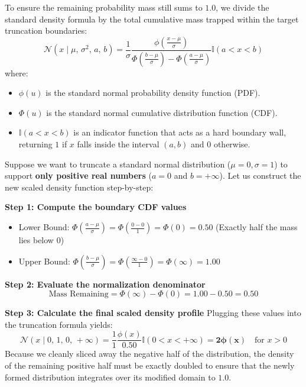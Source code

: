 \documentclass{article}
\begin{document}
To ensure the remaining probability mass still sums to $1.0$, we divide the standard density formula by the total cumulative mass trapped within the target truncation boundaries:
\begin{equation}
    \mathcal{N}(x \mid \mu, \, \sigma^2, \, a, \, b) = \frac{1}{\sigma} \frac{\phi\left( \frac{x - \mu}{\sigma} \right)}{\Phi\left( \frac{b - \mu}{\sigma} \right) - \Phi\left( \frac{a - \mu}{\sigma} \right)} \mathbb{I}(a < x < b)
\end{equation}
where:
\begin{itemize}
    \item $\phi(u)$ is the standard normal probability density function (PDF).
    \item $\Phi(u)$ is the standard normal cumulative distribution function (CDF).
    \item $\mathbb{I}(a < x < b)$ is an indicator function that acts as a hard boundary wall, returning $1$ if $x$ falls inside the interval $(a, b)$ and $0$ otherwise.
\end{itemize}

\begin{tcolorbox}[colback=red!5!white, colframe=red!60!black, title=Numerical Verification: Semi-Infinite Slicing]
Suppose we want to truncate a standard normal distribution ($\mu=0, \sigma=1$) to support \textbf{only positive real numbers} ($a=0$ and $b=+\infty$). Let us construct the new scaled density function step-by-step:

\noindent \textbf{Step 1: Compute the boundary CDF values}
\begin{itemize}
    \item Lower Bound: $\Phi\left(\frac{a - \mu}{\sigma}\right) = \Phi\left(\frac{0 - 0}{1}\right) = \Phi(0) = \mathbf{0.50}$ (Exactly half the mass lies below 0)
    \item Upper Bound: $\Phi\left(\frac{b - \mu}{\sigma}\right) = \Phi\left(\frac{\infty - 0}{1}\right) = \Phi(\infty) = \mathbf{1.00}$
\end{itemize}

\noindent \textbf{Step 2: Evaluate the normalization denominator}
\begin{equation*}
    \text{Mass Remaining} = \Phi(\infty) - \Phi(0) = 1.00 - 0.50 = \mathbf{0.50}
\end{equation*}

\noindent \textbf{Step 3: Calculate the final scaled density profile}
Plugging these values into the truncation formula yields:
\begin{equation*}
    \mathcal{N}(x \mid 0, \, 1, \, 0, \, +\infty) = \frac{1}{1} \frac{\phi(x)}{0.50} \mathbb{I}(0 < x < +\infty) = \mathbf{2\phi(x)} \quad \text{for } x > 0
\end{equation*}
Because we cleanly sliced away the negative half of the distribution, the density of the remaining positive half must be exactly doubled to ensure that the newly formed distribution integrates over its modified domain to $1.0$.
\end{tcolorbox}
\end{document}
